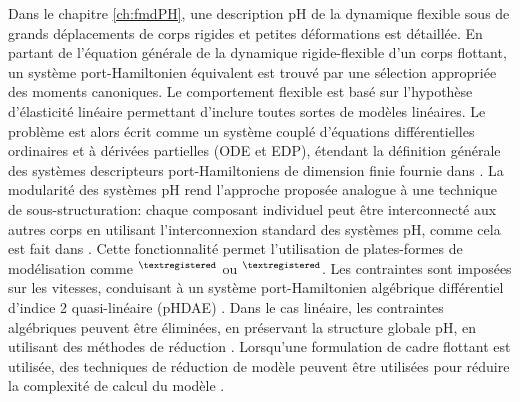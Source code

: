 Dans le chapitre \ref{ch:fmdPH},  une description pH de la dynamique flexible sous de grands déplacements de corps rigides et petites déformations est détaillée. En partant de l'équation générale de la dynamique rigide-flexible d'un corps flottant, un système port-Hamiltonien équivalent est trouvé par une sélection appropriée des moments canoniques. Le comportement flexible est basé sur l'hypothèse d'élasticité linéaire permettant d'inclure toutes sortes de modèles linéaires. Le problème est alors écrit comme un système couplé d'équations différentielles ordinaires et à dérivées partielles (ODE et EDP), étendant la définition générale des systèmes descripteurs port-Hamiltoniens de dimension finie fournie dans \cite{mehrmann2019structurepreserving}. La modularité des systèmes pH rend l'approche proposée analogue à une technique de sous-structuration: chaque composant individuel peut être interconnecté aux autres corps en utilisant l'interconnexion standard des systèmes pH, comme cela est fait dans \cite{macchelli2007link}. Cette fonctionnalité permet l'utilisation de plates-formes de modélisation comme {}$^{\tiny{\textregistered}}$ ou {}$^{\tiny{\textregistered}}$. Les contraintes sont imposées sur les vitesses, conduisant à un système port-Hamiltonien algébrique différentiel d'indice 2 quasi-linéaire (pHDAE) \cite{steinbrecher2006phd,beattie2018linear}. Dans le cas linéaire, les contraintes algébriques peuvent être éliminées, en préservant la structure globale pH, en utilisant des méthodes de réduction \cite{leyendecker2008nullspace}. Lorsqu'une formulation de cadre flottant est utilisée, des techniques de réduction de modèle peuvent être utilisées pour réduire la complexité de calcul du modèle \cite{chaturantabut2016,egger2018}. 

